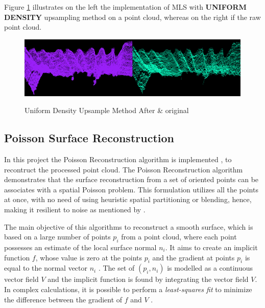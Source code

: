 \documentclass[12pt]{report}
\begin{document}
Figure \ref{fig:sUpsample_def} illustrates on the left the implementation of MLS with \textbf{UNIFORM DENSITY} upsampling method on a point cloud, whereas on the right if the raw point cloud.

\begin{figure}[H]%
  \centering
  \includegraphics[width=1\textwidth]{upsample_def.png}
 \caption{Uniform Density Upsample Method After \& original}\cite[]{ichim_2012}
 \label{fig:sUpsample_def} 
\end{figure}







\newpage
\subsection{Poisson Surface Reconstruction}
\label{section:Poisson Surface Reconstruction}
In this project the Poisson Reconstruction algorithm is implemented , to recontruct the processed point cloud.
The Poisson Reconstruction algorithm demonstrates that the surface reconstruction from a set of oriented points can be associates with a spatial Poisson problem.
This formulation utilizes all the points at once, with no need of using heuristic spatial partitioning or blending, hence, making it resilient to noise as mentioned by .

The main objective of this algorithms to reconstruct a smooth surface, which is based on a large number of points $p_i$ from a point cloud, where each point possesses an estimate of the local surface normal $n_i$.
It aims to create an implicit function $f$, whose value is zero at the points $p_i$ and the gradient at points $p_i$ is equal to the normal vector $n_i$ .
The set of $(p_i,n_i)$ is modelled as a continuous vector field $V$ and the implicit function is found by integrating the vector field $V$.
In complex calculations, it is possible to perform a \textit{least-squares fit} to minimize the difference between the gradient of $f$ and $V$ .
\end{document}
